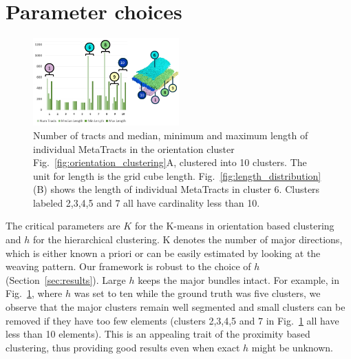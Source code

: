 \section{Parameter choices}
\label{sec:param_choices}
\begin{figure}[tb]
\centering
	\includegraphics[width=0.5\textwidth,  trim = 0mm 260mm 0mm 15mm, clip]{images_pvis/figure9}
	\caption{Number of tracts and median, minimum and maximum length of individual MetaTracts in the orientation cluster Fig.~\ref{fig:orientation_clustering}A, clustered into 10 clusters. The unit for length is the grid cube length. Fig.~\ref{fig:length_distribution}(B) shows the length of individual MetaTracts in cluster 6. Clusters labeled 2,3,4,5 and 7 all have cardinality less than 10. }
	\label{fig:len_dist_crop16}
\end{figure}
The critical parameters are $K$ for the K-means in orientation based clustering and $h$ for the hierarchical clustering. K denotes the number of major directions, which is either known a priori or can be easily estimated by looking at the weaving pattern. 
Our framework is robust to the choice of $h$ (Section~\ref{sec:results}). Large $h$ keeps the major bundles intact. For example, in  Fig.~\ref{fig:len_dist_crop16}, where $h$ was set to ten while the ground truth was five clusters, we observe that the major clusters remain well segmented and small clusters can be removed if they have too few elements (clusters 2,3,4,5 and 7 in Fig.~\ref{fig:len_dist_crop16} all have less than 10 elements). This is an appealing trait of the proximity based clustering, thus providing good results even when exact $h$ might be unknown.
